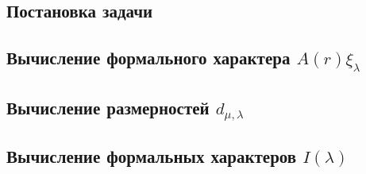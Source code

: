 	\subsection{Постановка задачи}
		
	\subsection{Вычисление формального характера $ A(r)\xi_{\lambda} $}
		
	\subsection{Вычисление размерностей $ d_{\mu,\lambda} $}
		
	\subsection{Вычисление формальных характеров $I(\lambda)$}
		